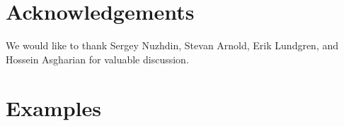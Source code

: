 \documentclass{article}
\newcommand{\plr}[1]{\todo[color=blue!25]{#1}}
\newcommand{\plr}[1]{{\color{blue}\it #1}}
\newcommand{\jss}[1]{{\color{olive}\it #1}}
\newcommand{\1}{\mathbbm{1}}
\begin{document}

%

\section*{Acknowledgements}
We would like to thank Sergey Nuzhdin, Stevan Arnold, Erik Lundgren, and Hossein Asgharian for valuable discussion.




\normalsize

\section*{Examples}
 
\end{document}
